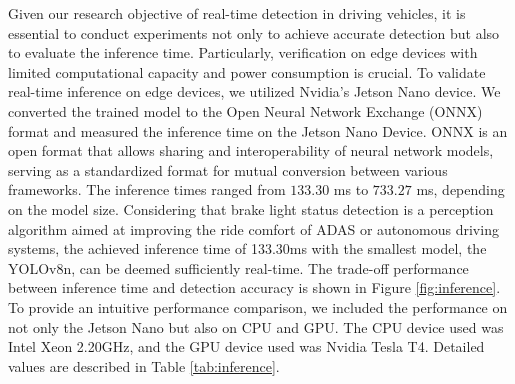Given our research objective of real-time detection in driving vehicles, it is essential to conduct experiments not only to achieve accurate detection but also to evaluate the inference time. Particularly, verification on edge devices with limited computational capacity and power consumption is crucial. To validate real-time inference on edge devices, we utilized Nvidia's Jetson Nano device.
We converted the trained model to the Open Neural Network Exchange (ONNX) format and measured the inference time on the Jetson Nano Device.
ONNX is an open format that allows sharing and interoperability of neural network models, serving as a standardized format for mutual conversion between various frameworks.
The inference times ranged from $133.30$ ms to $733.27$ ms, depending on the model size. 
Considering that brake light status detection is a perception algorithm aimed at improving the ride comfort of ADAS or autonomous driving systems, the achieved inference time of 133.30ms with the smallest model, the YOLOv8n, can be deemed sufficiently real-time.
The trade-off performance between inference time and detection accuracy is shown in Figure \ref{fig:inference}.
To provide an intuitive performance comparison, we included the performance on not only the Jetson Nano but also on CPU and GPU.
The CPU device used was Intel Xeon 2.20GHz, and the GPU device used was Nvidia Tesla T4.
Detailed values are described in Table \ref{tab:inference}.



